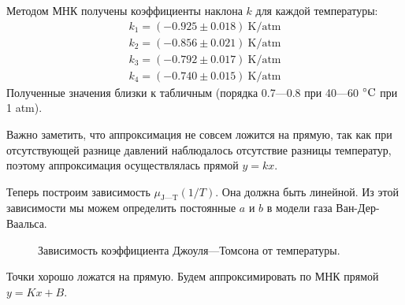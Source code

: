 \documentclass[a4paper,12pt]{report}
\begin{document}
    \begin{multicols}{2}
        Методом МНК получены коэффициенты наклона $k$ для каждой температуры:
        \begin{align*}
            k_1=(-0.925\pm 0.018)\ \text{K}/\text{atm}\\
            k_2=(-0.856\pm 0.021)\ \text{K}/\text{atm}\\
            k_3=(-0.792\pm 0.017)\ \text{K}/\text{atm}\\
            k_4=(-0.740\pm 0.015)\ \text{K}/\text{atm}
        \end{align*}
        Полученные значения близки к табличным (порядка 0.7---0.8 при 40---60 $\celsius$ при 1 atm).

        Важно заметить, что аппроксимация не совсем ложится на прямую, так как при отсутствующей разнице давлений наблюдалось отсутствие разницы температур, поэтому аппроксимация осуществлялась прямой $y=kx$.

        Теперь построим зависимость $\mu_\text{J---T}(1/T)$. Она должна быть линейной. Из этой зависимости мы можем определить постоянные $a$ и $b$ в модели газа Ван-Дер-Ваальса.
        \begin{figure}[H]
            \centering
            \caption{Зависимость коэффициента Джоуля---Томсона от температуры.}
        \end{figure}
        Точки хорошо ложатся на прямую. Будем аппроксимировать по МНК прямой $y=Kx+B$.


\end{multicols}
\end{document}
